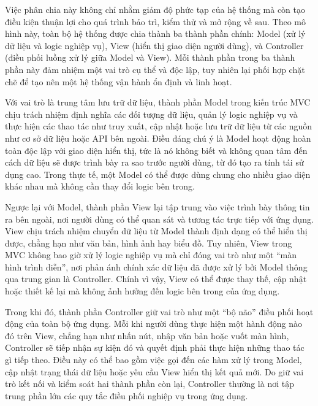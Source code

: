     \begin{flushleft}
      \hspace*{0.8cm}Việc phân chia này không chỉ nhằm giảm độ phức tạp của hệ thống mà còn tạo điều kiện thuận lợi cho quá trình bảo trì, kiểm thử và mở rộng về sau. Theo mô hình này, toàn bộ hệ thống được chia thành ba thành phần chính: Model (xử lý dữ liệu và logic nghiệp vụ), View (hiển thị giao diện người dùng), và Controller (điều phối luồng xử lý giữa Model và View). Mỗi thành phần trong ba thành phần này đảm nhiệm một vai trò cụ thể và độc lập, tuy nhiên lại phối hợp chặt chẽ để tạo nên một hệ thống vận hành ổn định và linh hoạt.
    \end{flushleft}

    \begin{flushleft}
      \hspace*{0.8cm}Với vai trò là trung tâm lưu trữ dữ liệu, thành phần Model trong kiến trúc MVC chịu trách nhiệm định nghĩa các đối tượng dữ liệu, quản lý logic nghiệp vụ và thực hiện các thao tác như truy xuất, cập nhật hoặc lưu trữ dữ liệu từ các nguồn như cơ sở dữ liệu hoặc API bên ngoài. Điều đáng chú ý là Model hoạt động hoàn toàn độc lập với giao diện hiển thị, tức là nó không biết và không quan tâm đến cách dữ liệu sẽ được trình bày ra sao trước người dùng, từ đó tạo ra tính tái sử dụng cao. Trong thực tế, một Model có thể được dùng chung cho nhiều giao diện khác nhau mà không cần thay đổi logic bên trong.
    \end{flushleft}

    \begin{flushleft}
      \hspace*{0.8cm}Ngược lại với Model, thành phần View lại tập trung vào việc trình bày thông tin ra bên ngoài, nơi người dùng có thể quan sát và tương tác trực tiếp với ứng dụng. View chịu trách nhiệm chuyển dữ liệu từ Model thành định dạng có thể hiển thị được, chẳng hạn như văn bản, hình ảnh hay biểu đồ. Tuy nhiên, View trong MVC không bao giờ xử lý logic nghiệp vụ mà chỉ đóng vai trò như một “màn hình trình diễn”, nơi phản ánh chính xác dữ liệu đã được xử lý bởi Model thông qua trung gian là Controller. Chính vì vậy, View có thể được thay thế, cập nhật hoặc thiết kế lại mà không ảnh hưởng đến logic bên trong của ứng dụng.
    \end{flushleft}

    \begin{flushleft}
      \hspace*{0.8cm}Trong khi đó, thành phần Controller giữ vai trò như một “bộ não” điều phối hoạt động của toàn bộ ứng dụng. Mỗi khi người dùng thực hiện một hành động nào đó trên View, chẳng hạn như nhấn nút, nhập văn bản hoặc vuốt màn hình, Controller sẽ tiếp nhận sự kiện đó và quyết định phải thực hiện những thao tác gì tiếp theo. Điều này có thể bao gồm việc gọi đến các hàm xử lý trong Model, cập nhật trạng thái dữ liệu hoặc yêu cầu View hiển thị kết quả mới. Do giữ vai trò kết nối và kiểm soát hai thành phần còn lại, Controller thường là nơi tập trung phần lớn các quy tắc điều phối nghiệp vụ trong ứng dụng.
    \end{flushleft}

